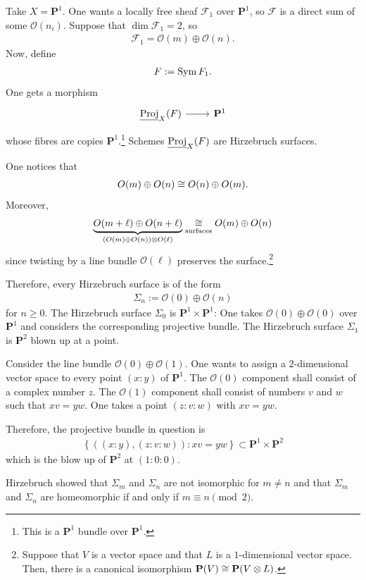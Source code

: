 \documentclass [11 pt, oneside] {article}
\begin{document}
\begin{example}[ ]\label{}\text{}
Take $X=\mathbf{P}^1$. One wants a locally free sheaf $\mathscr{F}_1$ over $\mathbf{P}^1$, so $\mathscr{F}$ is a direct sum of some $\mathscr{O}(n_i)$.
Suppose that $\dim \mathscr{F}_1=2$, so
\begin{align*}
	\mathscr{F}_1 = \mathscr{O}(m)\oplus  \mathscr{O}(n).
\end{align*}
Now, define
\begin{align*}
	\relax{F} := \operatorname{Sym} \relax{F}_1. 
\end{align*}
One gets a morphism
\[
\begin{tikzcd}
	\underline{\Proj}_X(\mathscr{F}) \ar[r]& \mathbf{P}^1
\end{tikzcd}
\]
whose fibres are copies $\mathbf{P}^1$.\footnote{This is a $\mathbf{P}^1$ bundle over $\mathbf{P}^1$.}
Schemes $\underline{\operatorname{Proj}}_X(\relax{F})$ are Hirzebruch surfaces.

One notices that
\begin{align*}
	\relax{O}(m)\oplus  \relax{O}(n) \cong  \relax{O}(n)\oplus  \relax{O}(m).
\end{align*}
Moreover,
\begin{align*}
	\underbrace{\relax{O}(m+\ell) \oplus  \relax{O}(n+\ell)}_{ (\relax{O}(m)\oplus  \relax{O}(n)) \otimes \relax{O}(\ell)} \underset{\textrm{surfaces}}{\cong}  \relax{O}(m)\oplus  \relax{O}(n)
\end{align*}
since twisting by a line bundle $\mathscr{O}(\ell)$ preserves the surface.\footnote{Suppose that $V$ is a vector space and that $L$ is a $1$-dimensional vector space. Then, there is a canonical isomorphism $\mathbf{P}(V)\cong  \mathbf{P}(V\otimes L)$.}

Therefore, every Hirzebruch surface is of the form
\begin{align*}
	\Sigma_n := \mathscr{O}(0)\oplus  \mathscr{O}(n)
\end{align*}
for $n\ge 0$. The Hirzebruch surface $\Sigma_0$ is $\mathbf{P}^1\times \mathbf{P}^1$: One takes $\mathscr{O}(0)\oplus  \mathscr{O}(0)$ over $\mathbf{P}^1$ and considers the corresponding projective bundle.
The Hirzebruch surface $\Sigma_1$ is $\mathbf{P}^2$ blown up at a point. 

Consider the line bundle $\mathscr{O}(0)\oplus  \mathscr{O}(1)$. One wants to assign a $2$-dimensional vector space to every point $(x:y)$ of $\mathbf{P}^1$. The $\mathscr{O}(0)$ component shall consist of a complex number $z$. The $\mathscr{O}(1)$ component shall consist of numbers $v$ and $w$ such that $xv = yw$. One takes a point $(z:v:w)$ with $xv = yw$.

Therefore, the projective bundle in question is
\begin{align*}
	\left\{ \left( (x:y),  (z:v:w) \right) : xv=yw  \right\}\subset \mathbf{P}^1\times \mathbf{P}^2 
\end{align*}
which is the blow up of $\mathbf{P}^2$ at $(1:0:0)$.

Hirzebruch showed that $\Sigma_m$ and $\Sigma_n$ are not isomorphic for $m\ne n$ and that $\Sigma_m$ and $\Sigma_n$ are homeomorphic if and only if $m\equiv n\pmod 2$.
\end{example}
\end{document}
